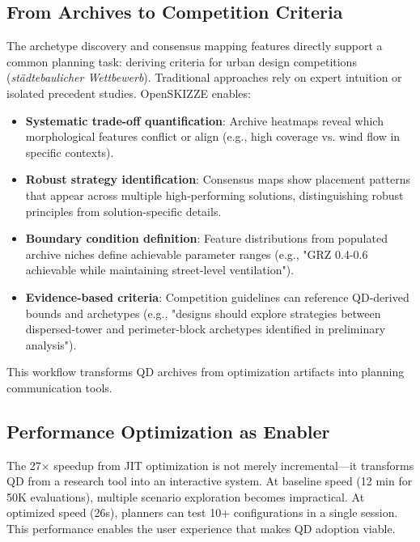 \documentclass[times,final]{elsarticle}
\begin{document}
\subsection{From Archives to Competition Criteria}

The archetype discovery and consensus mapping features directly support a common planning task: deriving criteria for urban design competitions (\textit{städtebaulicher Wettbewerb}). Traditional approaches rely on expert intuition or isolated precedent studies. OpenSKIZZE enables:

\begin{itemize}
\item \textbf{Systematic trade-off quantification}: Archive heatmaps reveal which morphological features conflict or align (e.g., high coverage vs. wind flow in specific contexts).

\item \textbf{Robust strategy identification}: Consensus maps show placement patterns that appear across multiple high-performing solutions, distinguishing robust principles from solution-specific details.

\item \textbf{Boundary condition definition}: Feature distributions from populated archive niches define achievable parameter ranges (e.g., "GRZ 0.4-0.6 achievable while maintaining street-level ventilation").

\item \textbf{Evidence-based criteria}: Competition guidelines can reference QD-derived bounds and archetypes (e.g., "designs should explore strategies between dispersed-tower and perimeter-block archetypes identified in preliminary analysis").
\end{itemize}

This workflow transforms QD archives from optimization artifacts into planning communication tools.

\subsection{Performance Optimization as Enabler}

The 27$\times$ speedup from JIT optimization is not merely incremental—it transforms QD from a research tool into an interactive system. At baseline speed (12 min for 50K evaluations), multiple scenario exploration becomes impractical. At optimized speed (26s), planners can test 10+ configurations in a single session. This performance enables the user experience that makes QD adoption viable.
\end{document}
